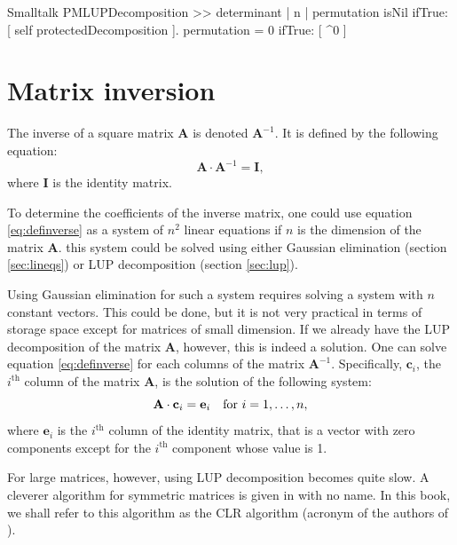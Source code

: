 \begin{displaycode}{Smalltalk}
PMLUPDecomposition >> determinant
    | n |
    permutation isNil
        ifTrue: [ self protectedDecomposition ].
    permutation = 0
        ifTrue: [ ^0 ]  
\end{displaycode}

\section{Matrix inversion}
\label{sec:matrixinversion} The inverse of a square matrix $\textbf{A}$ is denoted $\textbf{A}^{-1}$. It is defined by the following
equation:
\begin{equation}
\label{eq:definverse} \textbf{A}\cdot\textbf{A}^{-1}=\textbf{I},
\end{equation}
where $\textbf{I}$ is the identity matrix.

To determine the coefficients of the inverse matrix, one could use
equation \ref{eq:definverse} as a system of $n^2$ linear equations
if $n$ is the dimension of the matrix $\textbf{A}$. this system could
be solved using either Gaussian elimination (\cf section
\ref{sec:lineqs}) or LUP decomposition (\cf section
\ref{sec:lup}).

Using Gaussian elimination for such a system requires solving a
system with $n$ constant vectors. This could be done, but it is
not very practical in terms of storage space except for matrices
of small dimension. If we already have the LUP decomposition of
the matrix $\textbf{A}$, however, this is indeed a solution. One can
solve equation \ref{eq:definverse} for each columns of the matrix
$\textbf{A}^{-1}$. Specifically, $\textbf{c}_i$, the $i^{\mathop{th}}$
column of the matrix $\textbf{A}$, is the solution of the following
system:
\begin{equation}
  \textbf{A}\cdot\textbf{c}_i=\textbf{e}_i\mbox{\quad for $i=1,\ldots,n$},
\end{equation}
where $\textbf{e}_i$ is the $i^{\mathop{th}}$ column of the identity
matrix, that is a vector with zero components except for the
$i^{\mathop{th}}$ component whose value is 1.

For large matrices, however, using LUP decomposition becomes quite
slow. A cleverer algorithm for symmetric matrices is given in
\cite{CorLeiRiv} with no name. In this book, we shall refer to
this algorithm as the CLR algorithm (acronym of the authors of
\cite{CorLeiRiv}).

